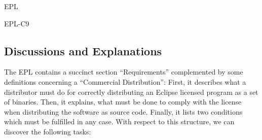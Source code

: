 \begin{license}{EPL}
\begin{lsuc}{EPL-C9}

  \begin{lsucrequires}
    \lsucmandatory{\keepLicensingElements\ \addWhenCompiling}
    \lsucmandatory{\describeModifications}
    \lsucmandatory{\markAllModifications}
    \lsucmandatory{\linkToRepo}
    \lsucmandatory{\organizeYourModifications}
    \lsucoptional{\addToYourCopyrightNotice}
  \end{lsucrequires}

  \begin{lsucprohibits}
    \lsucitem{\dontChangeCopyrightNotices}
  \end{lsucprohibits}

\end{lsuc}

\subsection{Discussions and Explanations}
\label{EPLDiscussion}

The EPL contains a succinct section \enquote{Requirements}
complemented by some definitions concerning a \enquote{Commercial
Distribution}: First, it describes what a distributor must do for
correctly distributing an Eclipse licensed program as a set of binaries. Then,
it explains, what must be done to comply with the license when distributing the
software as source code.  Finally, it lists two conditions which must be
fulfilled in any case.  
With respect to this structure, we can discover the following tasks:

\begin{itemize}


\end{itemize}
\end{license}
